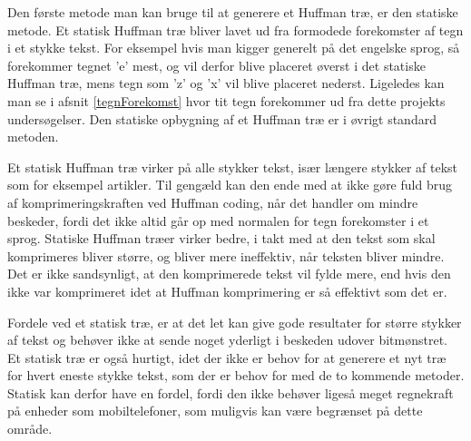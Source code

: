 Den første metode man kan bruge til at generere et Huffman træ, er den statiske metode. Et statisk Huffman træ bliver lavet ud fra formodede forekomster af tegn i et stykke tekst. For eksempel hvis man kigger generelt på det engelske sprog, så forekommer tegnet ’e’ mest, og vil derfor blive placeret øverst i det statiske Huffman træ, mens tegn som ’z’ og ’x’ vil blive placeret nederst\cite{Hufftree_2}. Ligeledes kan man se i afsnit \ref{tegnForekomst} hvor tit tegn forekommer ud fra dette projekts undersøgelser. Den statiske opbygning af et Huffman træ er i øvrigt standard metoden.

Et statisk Huffman træ virker på alle stykker tekst, især længere stykker af tekst som for eksempel artikler. Til gengæld kan den ende med at ikke gøre fuld brug af komprimeringskraften ved Huffman coding, når det handler om mindre beskeder, fordi det ikke altid går op med normalen for tegn forekomster i et sprog. Statiske Huffman træer virker bedre, i takt med at den tekst som skal komprimeres bliver større, og bliver mere ineffektiv, når teksten bliver mindre. Det er ikke sandsynligt, at den komprimerede tekst vil fylde mere, end hvis den ikke var komprimeret idet at Huffman komprimering er så effektivt som det er. \cite{Hufftree_3}

Fordele ved et statisk træ, er at det let kan give gode resultater for større stykker af tekst og behøver ikke at sende noget yderligt i beskeden udover bitmønstret. Et statisk træ er også hurtigt, idet der ikke er behov for at generere et nyt træ for hvert eneste stykke tekst, som der er behov for med de to kommende metoder. Statisk kan derfor have en fordel, fordi den ikke behøver ligeså meget regnekraft på enheder som mobiltelefoner, som muligvis kan være begrænset på dette område.
